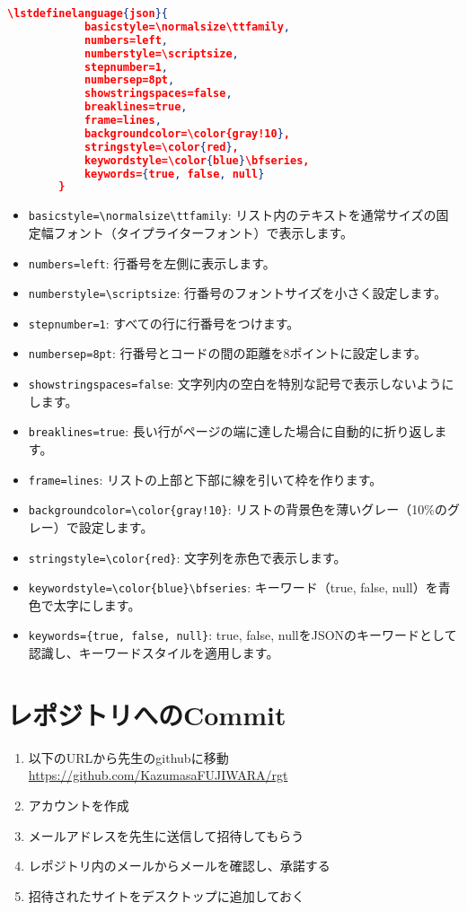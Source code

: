 \documentclass{article}
\begin{document}
    \begin{lstlisting}[language=json]
        \lstdefinelanguage{json}{
            basicstyle=\normalsize\ttfamily,
            numbers=left,
            numberstyle=\scriptsize,
            stepnumber=1,
            numbersep=8pt,
            showstringspaces=false,
            breaklines=true,
            frame=lines,
            backgroundcolor=\color{gray!10},
            stringstyle=\color{red},
            keywordstyle=\color{blue}\bfseries,
            keywords={true, false, null}
        }
    \end{lstlisting}

    \begin{itemize}
        \item \texttt{basicstyle=\textbackslash{}normalsize\textbackslash{}ttfamily}: リスト内のテキストを通常サイズの固定幅フォント（タイプライターフォント）で表示します。
        \item \texttt{numbers=left}: 行番号を左側に表示します。
        \item \texttt{numberstyle=\textbackslash{}scriptsize}: 行番号のフォントサイズを小さく設定します。
        \item \texttt{stepnumber=1}: すべての行に行番号をつけます。
        \item \texttt{numbersep=8pt}: 行番号とコードの間の距離を8ポイントに設定します。
        \item \texttt{showstringspaces=false}: 文字列内の空白を特別な記号で表示しないようにします。
        \item \texttt{breaklines=true}: 長い行がページの端に達した場合に自動的に折り返します。
        \item \texttt{frame=lines}: リストの上部と下部に線を引いて枠を作ります。
        \item \texttt{backgroundcolor=\textbackslash{}color\{gray!10\}}: リストの背景色を薄いグレー（10\%のグレー）で設定します。
        \item \texttt{stringstyle=\textbackslash{}color\{red\}}: 文字列を赤色で表示します。
        \item \texttt{keywordstyle=\textbackslash{}color\{blue\}\textbackslash{}bfseries}: キーワード（true, false, null）を青色で太字にします。
        \item \texttt{keywords=\{true, false, null\}}: true, false, nullをJSONのキーワードとして認識し、キーワードスタイルを適用します。
    \end{itemize}

    \part{レポジトリへのCommit}

    \begin{enumerate}
        \item 以下のURLから先生のgithubに移動
        \url{https://github.com/KazumasaFUJIWARA/rgt}
        
        \item アカウントを作成
        \item メールアドレスを先生に送信して招待してもらう
        \item レポジトリ内のメールからメールを確認し、承諾する
        \item 招待されたサイトをデスクトップに追加しておく
    \end{enumerate}
\end{document}
